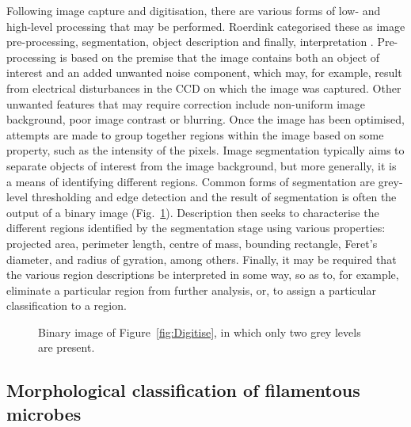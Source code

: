 Following image capture and digitisation, there are various forms of low- and high-level processing that may be performed. Roerdink categorised these as image pre-processing, segmentation, object description and finally, interpretation \cite{roerdink1998}. Pre-processing is based on the premise that the image contains both an object of interest and an added unwanted noise component, which may, for example, result from electrical disturbances in the CCD on which the image was captured. Other unwanted features that may require correction include non-uniform image background, poor image contrast or blurring. Once the image has been optimised, attempts are made to group together regions within the image based on some property, such as the intensity of the pixels. Image segmentation typically aims to separate objects of interest from the image background, but more generally, it is a means of identifying different regions. Common forms of segmentation are grey-level thresholding and edge detection and the result of segmentation is often the output of a binary image (Fig.~\ref{fig:Binarise}). Description then seeks to characterise the different regions identified by the segmentation stage using various properties: projected area, perimeter length, centre of mass, bounding rectangle, Feret's diameter, and radius of gyration, among others. Finally, it may be required that the various region descriptions be interpreted in some way, so as to, for example, eliminate a particular region from further analysis, or, to assign a particular classification to a region.

\begin{figure}[tb]
	\centering
  \caption{Binary image of Figure~\ref{fig:Digitise}, in which only two grey levels are present.}
  \label{fig:Binarise}
\end{figure}

\subsection{Morphological classification of filamentous microbes}

